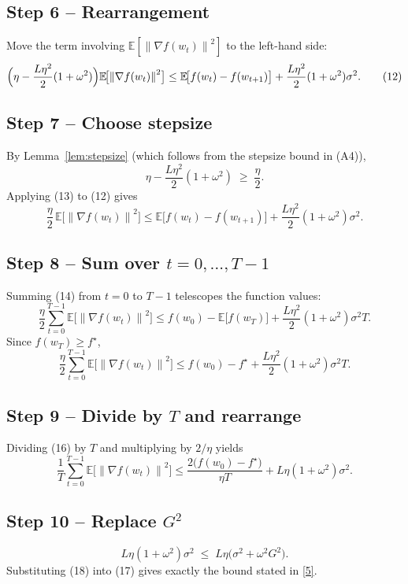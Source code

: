 \documentclass{article}
\newcommand{\E}{\mathbb{E}}
\newcommand{\norm}[1]{\left\lVert#1\right\rVert}
\begin{document}
\subsection*{Step 6 – Rearrangement}
Move the term involving $\E[\norm{\nabla f(w_{t})}^{2}]$ to the left-hand side:
\[
\Bigl(\eta-\frac{L\eta^{2}}{2}(1+\omega^{2})\Bigr)
\E\!\bigl[\norm{\nabla f(w_{t})}^{2}\bigr]
\le \E\!\bigl[f(w_{t})-f(w_{t+1})\bigr]
      +\frac{L\eta^{2}}{2}(1+\omega^{2})\sigma^{2}. \tag{12}
\]

\subsection*{Step 7 – Choose stepsize}
By Lemma~\ref{lem:stepsize} (which follows from the stepsize bound in (A4)),
\[
\eta-\frac{L\eta^{2}}{2}(1+\omega^{2})\;\ge\;\frac{\eta}{2}.
\tag{13}
\]
Applying (13) to (12) gives
\[
\frac{\eta}{2}\,\E\!\bigl[\norm{\nabla f(w_{t})}^{2}\bigr]
\le \E\!\bigl[f(w_{t})-f(w_{t+1})\bigr]
      +\frac{L\eta^{2}}{2}(1+\omega^{2})\sigma^{2}. \tag{14}
\]

\subsection*{Step 8 – Sum over $t=0,\dots,T-1$}
Summing (14) from $t=0$ to $T-1$ telescopes the function values:
\[
\frac{\eta}{2}\sum_{t=0}^{T-1}\E\!\bigl[\norm{\nabla f(w_{t})}^{2}\bigr]
\le f(w_{0})- \E\!\bigl[f(w_{T})\bigr] 
   + \frac{L\eta^{2}}{2}(1+\omega^{2})\sigma^{2}T. \tag{15}
\]
Since $f(w_{T})\ge f^{\star}$,
\[
\frac{\eta}{2}\sum_{t=0}^{T-1}\E\!\bigl[\norm{\nabla f(w_{t})}^{2}\bigr]
\le f(w_{0})-f^{\star}
   + \frac{L\eta^{2}}{2}(1+\omega^{2})\sigma^{2}T. \tag{16}
\]

\subsection*{Step 9 – Divide by $T$ and rearrange}
Dividing (16) by $T$ and multiplying by $2/\eta$ yields
\[
\frac{1}{T}\sum_{t=0}^{T-1}\E\!\bigl[\norm{\nabla f(w_{t})}^{2}\bigr]
\le
\frac{2\bigl(f(w_{0})-f^{\star}\bigr)}{\eta T}
+ L\eta(1+\omega^{2})\sigma^{2}. \tag{17}
\]

\subsection*{Step 10 – Replace $G^{2}$}
\[
L\eta(1+\omega^{2})\sigma^{2}
\;\le\;
L\eta\bigl(\sigma^{2}+\omega^{2}G^{2}\bigr). \tag{18}
\]
Substituting (18) into (17) gives exactly the bound stated in \eqref{5}.
\end{document}
